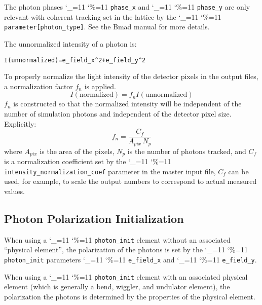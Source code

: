 \documentclass[11pt]{article}
\newcommand{\Begineq}{\begin{equation}}
\newcommand{\Endeq}{\end{equation}}
\newcommand\ttcmd{\begingroup\catcode`\_=11 \catcode`\%=11 \dottcmd}
\newcommand\dottcmd[1]{\texttt{#1}\endgroup}
\newcommand{\vn}{\ttcmd}
\newenvironment{example}
  {\vspace{\ExBeg} \begin{alltt}}
  {\end{alltt} \vspace{\ExEnd}}
\newlength{\ExBeg}
\newlength{\ExEnd}
\begin{document}
The photon phases \vn{phase_x} and \vn{phase_y} are only relevant with
coherent tracking set in the lattice by the
\vn{parameter[photon_type]}. See the Bmad manual for more details.

The unnormalized intensity of a photon is:
\begin{example}
  I(unnormalized) = e_field_x^2 + e_field_y^2
\end{example}

To properly normalize the light intensity of the detector pixels in
the output files, a normalization factor $f_n$ is applied.
\Begineq
  I (\mbox{normalized}) = f_n I (\mbox{unnormalized}) 
\Endeq
$f_n$ is constructed so that the normalized intensity will be
independent of the number of simulation photons and independent of the
detector pixel size. Explicitly:
\Begineq
  f_n = \frac{C_f}{A_{pix} \, N_p}
\Endeq
where $A_{pix}$ is the area of the pixels, $N_p$ is the number of
photons tracked, and $C_f$ is a normalization coefficient set by the
\vn{intensity_normalization_coef} parameter in the master input file,
$C_f$ can be used, for example, to scale the output numbers to
correspond to actual measured values.

\subsection{Photon Polarization Initialization}

When using a \vn{photon_init} element without an associated ``physical
element'', the polarization of the photons is set by the
\vn{photon_init} parameters \vn{e_field_x} and \vn{e_field_y}. 

When using a \vn{photon_init} element with an associated physical
element (which is generally a bend, wiggler, and undulator element),
the polarization the photons is determined by the
properties of the physical element.
\end{document}
